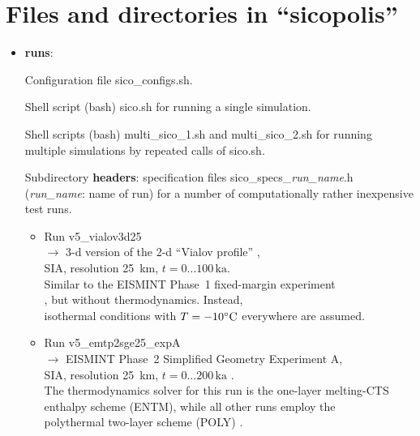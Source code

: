 \documentclass[12pt,a4paper]{article}
\begin{document}



\section{Files and directories in ``sicopolis''}

\begin{itemize}

\item \textbf{runs}:

Configuration file sico\_configs.sh.

Shell script (bash) sico.sh for running a single simulation.

Shell scripts (bash) multi\_sico\_1.sh and multi\_sico\_2.sh for running multiple simulations by repeated calls of sico.sh.

Subdirectory \textbf{headers}: specification files sico\_specs\_\emph{run\_name}.h (\emph{run\_name}: name of run) for a number of computationally rather inexpensive test runs.

\begin{itemize}

\item
Run v5\_vialov3d25
\\
$\longrightarrow$ 3-d version of the 2-d ``Vialov profile'' \citep{vialov_1958},
\\
\phantom{$\longrightarrow$} SIA, resolution 25~km, $t=0\ldots{}100\,\mathrm{ka}$.
\\
\phantom{$\longrightarrow$} Similar to the EISMINT Phase~1 fixed-margin experiment
\\
\phantom{$\longrightarrow$} \citep{huybrechts_etal_1996}, but without thermodynamics. Instead,
\\
\phantom{$\longrightarrow$} isothermal conditions with $T=-10^\circ\mathrm{C}$ everywhere are assumed.

\item
Run v5\_emtp2sge25\_expA
\\
$\longrightarrow$ EISMINT Phase~2 Simplified Geometry Experiment A,
\\
\phantom{$\longrightarrow$} SIA, resolution 25~km, $t=0\ldots{}200\,\mathrm{ka}$ \citep{payne_etal_2000}.
\\
\phantom{$\longrightarrow$} The thermodynamics solver for this run is the one-layer melting-CTS
\\
\phantom{$\longrightarrow$} enthalpy scheme (ENTM), while all other runs employ the 
\\
\phantom{$\longrightarrow$} polythermal two-layer scheme (POLY) \citep{greve_blatter_2016}.


\end{itemize}
\end{itemize}
\end{document}

